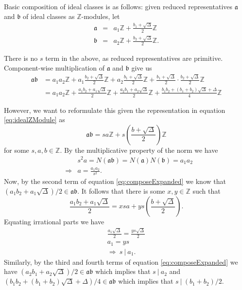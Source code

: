 \documentclass{ucalgthes1}
\theoremstyle{plain}
\theoremstyle{definition}
\newcommand{\ZZ}{\mathbb{Z}}
\begin{document}
Basic composition of ideal classes is as follows: given reduced representatives $\mathfrak{a}$ and $\mathfrak{b}$ of ideal classes as $\ZZ$-modules, let
\begin{eqnarray*}
	\mathfrak{a} & = & a_1 \ZZ + \frac{b_1 + \sqrt{\Delta}}{2} \ZZ \\
	\mathfrak{b} & = & a_2 \ZZ + \frac{b_2 + \sqrt{\Delta}}{2} \ZZ.
\end{eqnarray*}

\noindent
There is no $s$ term in the above, as reduced representatives are primitive.  Component-wise multiplication of $\mathfrak a$ and $\mathfrak b$ give us
\begin{equation}
\begin{split}
	\mathfrak{a} \mathfrak{b} & = a_1a_2 \ZZ + a_1 \frac{b_2 + \sqrt{\Delta}}{2} \ZZ + a_2 \frac{b_1 + \sqrt{\Delta}}{2} \ZZ + \frac{b_1 + \sqrt{\Delta}}{2} \cdot \frac{b_2 + \sqrt{\Delta}}{2} \ZZ \\
	& = a_1a_2 \ZZ + \frac{a_1b_2 + a_1\sqrt{\Delta}}{2} \ZZ + \frac{a_2b_1 + a_2\sqrt{\Delta}}{2} \ZZ + \frac{b_1b_2 + (b_1+b_2)\sqrt{\Delta} + \Delta}{4} \ZZ \label{eq:composeExpanded}
\end{split}
\end{equation}

\noindent
However, we want to reformulate this given the representation in equation \eqref{eq:idealZModule} as
\[
	\mathfrak{a} \mathfrak{b} = sa \ZZ + s \left(\frac{b + \sqrt{\Delta}}{2}\right) \ZZ
\]
for some $s, a, b \in \ZZ$.  By the multiplicative property of the norm we have
\begin{eqnarray*}
	&& s^2a = N(\mathfrak{a}\mathfrak{b}) = N(\mathfrak{a})N(\mathfrak{b}) = a_1 a_2 \\
	& \Rightarrow & a = \frac{a_1a_2}{s^2}.
\end{eqnarray*}
Now, by the second term of equation \eqref{eq:composeExpanded} we know that $(a_1b_2 + a_1\sqrt{\Delta})/2 \in \mathfrak{a}\mathfrak{b}$.  It follows that there is some $x,y \in \ZZ$ such that
\[
	\frac{a_1b_2 + a_1\sqrt{\Delta}}{2} = xsa + ys\left(\frac{b+\sqrt{\Delta}}{2}\right).
\]
Equating irrational parts we have
\begin{gather*}
	\frac{a_1\sqrt{\Delta}}{2} = \frac{ys\sqrt{\Delta}}{2} \\
	a_1 = ys \\
	\Rightarrow~ s~|~a_1.
\end{gather*}
\noindent
Similarly, by the third and fourth terms of equation \eqref{eq:composeExpanded} we have $(a_2b_1+a_2\sqrt{\Delta})/2 \in \mathfrak{a}\mathfrak{b}$ which implies that $s~|~a_2$ and $(b_1b_2 + (b_1+b_2)\sqrt{\Delta} + \Delta)/4 \in \mathfrak{a}\mathfrak{b}$ which implies that \break $s~|~(b_1+b_2)/2$. 
\end{document}

